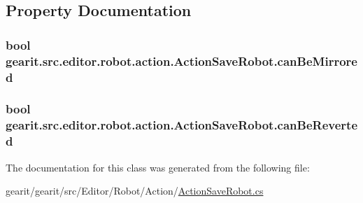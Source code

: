 \subsection{Property Documentation}
\hypertarget{classgearit_1_1src_1_1editor_1_1robot_1_1action_1_1_action_save_robot_a277d9e4316639de8980f035bed188dcf}{
\subsubsection[{can\+Be\+Mirrored}]{\setlength{\rightskip}{0pt plus 5cm}bool gearit.\+src.\+editor.\+robot.\+action.\+Action\+Save\+Robot.\+can\+Be\+Mirrored\hspace{0.3cm}{\ttfamily [get]}}}\label{classgearit_1_1src_1_1editor_1_1robot_1_1action_1_1_action_save_robot_a277d9e4316639de8980f035bed188dcf}
\hypertarget{classgearit_1_1src_1_1editor_1_1robot_1_1action_1_1_action_save_robot_a62c60d7bff56d12f852ed7ba7b6ae58e}{
\subsubsection[{can\+Be\+Reverted}]{\setlength{\rightskip}{0pt plus 5cm}bool gearit.\+src.\+editor.\+robot.\+action.\+Action\+Save\+Robot.\+can\+Be\+Reverted\hspace{0.3cm}{\ttfamily [get]}}}\label{classgearit_1_1src_1_1editor_1_1robot_1_1action_1_1_action_save_robot_a62c60d7bff56d12f852ed7ba7b6ae58e}


The documentation for this class was generated from the following file\+:\begin{DoxyCompactItemize}
\item 
gearit/gearit/src/\+Editor/\+Robot/\+Action/\hyperlink{_action_save_robot_8cs}{Action\+Save\+Robot.\+cs}\end{DoxyCompactItemize}
